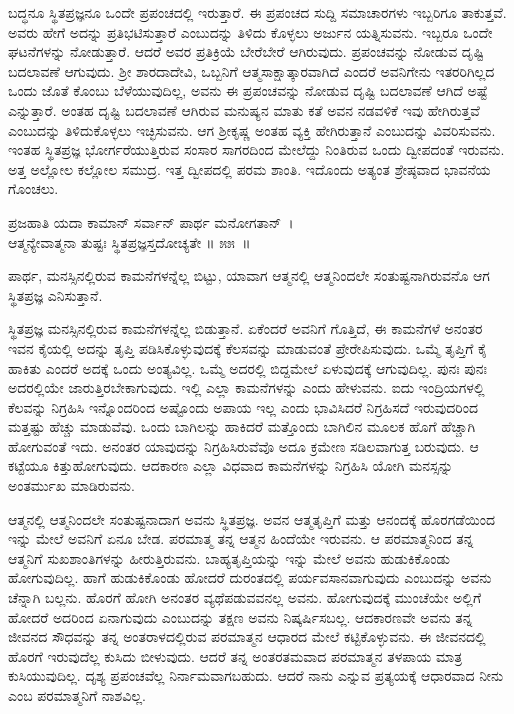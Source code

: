 ಬದ್ಧನೂ ಸ್ಥಿತಪ್ರಜ್ಞನೂ ಒಂದೇ ಪ್ರಪಂಚದಲ್ಲಿ ಇರುತ್ತಾರೆ. ಈ ಪ್ರಪಂಚದ ಸುದ್ದಿ ಸಮಾಚಾರಗಳು ಇಬ್ಬರಿಗೂ ತಾಕುತ್ತವೆ. ಅವರು ಹೇಗೆ ಅದನ್ನು ಪ್ರತಿಭಟಿಸುತ್ತಾರೆ ಎಂಬುದನ್ನು ತಿಳಿದು ಕೊಳ್ಳಲು ಅರ್ಜುನ ಯತ್ನಿಸುವನು. ಇಬ್ಬರೂ ಒಂದೇ ಘಟನೆಗಳನ್ನು ನೋಡುತ್ತಾರೆ. ಆದರೆ ಅವರ ಪ್ರತಿಕ್ರಿಯೆ ಬೇರೆಬೇರೆ ಆಗಿರುವುದು. ಪ್ರಪಂಚವನ್ನು ನೋಡುವ ದೃಷ್ಟಿ ಬದಲಾವಣೆ ಆಗುವುದು. ಶ‍್ರೀ ಶಾರದಾದೇವಿ, ಒಬ್ಬನಿಗೆ ಆತ್ಮಸಾಕ್ಷಾತ್ಕಾರವಾಗಿದೆ ಎಂದರೆ ಅವನಿಗೇನು ಇತರರಿಗಿಲ್ಲದ ಒಂದು ಜೊತೆ ಕೊಂಬು ಬೆಳೆಯುವುದಿಲ್ಲ, ಅವನು ಈ ಪ್ರಪಂಚವನ್ನು ನೋಡುವ ದೃಷ್ಟಿ ಬದಲಾವಣೆ ಆಗಿದೆ ಅಷ್ಟೆ ಎನ್ನುತ್ತಾರೆ. ಅಂತಹ ದೃಷ್ಟಿ ಬದಲಾವಣೆ ಆಗಿರುವ ಮನುಷ್ಯನ ಮಾತು ಕತೆ ಅವನ ನಡವಳಿಕೆ ಇವು ಹೇಗಿರುತ್ತವೆ ಎಂಬುದನ್ನು ತಿಳಿದುಕೊಳ್ಳಲು ಇಚ್ಛಿಸುವನು. ಆಗ ಶ‍್ರೀಕೃಷ್ಣ ಅಂತಹ ವ್ಯಕ್ತಿ ಹೇಗಿರುತ್ತಾನೆ ಎಂಬುದನ್ನು ವಿವರಿಸುವನು. ಇಂತಹ ಸ್ಥಿತಪ್ರಜ್ಞ ಭೋರ್ಗರೆಯುತ್ತಿರುವ ಸಂಸಾರ ಸಾಗರದಿಂದ ಮೇಲೆದ್ದು ನಿಂತಿರುವ ಒಂದು ದ್ವೀಪದಂತೆ ಇರುವನು. ಅತ್ತ ಅಲ್ಲೋಲ ಕಲ್ಲೋಲ ಸಮುದ್ರ. ಇತ್ತ ದ್ವೀಪದಲ್ಲಿ ಪರಮ ಶಾಂತಿ. ಇದೊಂದು ಅತ್ಯಂತ ಶ್ರೇಷ್ಠವಾದ ಭಾವನೆಯ ಗೊಂಚಲು.

\begin{shloka}
ಪ್ರಜಹಾತಿ ಯದಾ ಕಾಮಾನ್ ಸರ್ವಾನ್ ಪಾರ್ಥ ಮನೋಗತಾನ್~।\\ಆತ್ಮನ್ಯೇವಾತ್ಮನಾ ತುಷ್ಟಃ ಸ್ಥಿತಪ್ರಜ್ಞಸ್ತದೋಚ್ಯತೇ \hfill॥ ೫೫~॥
\end{shloka}

\begin{artha}
ಪಾರ್ಥ, ಮನಸ್ಸಿನಲ್ಲಿರುವ ಕಾಮನೆಗಳನ್ನೆಲ್ಲ ಬಿಟ್ಟು, ಯಾವಾಗ ಆತ್ಮನಲ್ಲಿ ಆತ್ಮನಿಂದಲೇ ಸಂತುಷ್ಟನಾಗಿರುವನೊ ಆಗ ಸ್ಥಿತಪ್ರಜ್ಞ ಎನಿಸುತ್ತಾನೆ.
\end{artha}

ಸ್ಥಿತಪ್ರಜ್ಞ ಮನಸ್ಸಿನಲ್ಲಿರುವ ಕಾಮನೆಗಳನ್ನೆಲ್ಲ ಬಿಡುತ್ತಾನೆ. ಏಕೆಂದರೆ ಅವನಿಗೆ ಗೊತ್ತಿದೆ, ಈ ಕಾಮನೆಗಳೆ ಅನಂತರ ಇವನ ಕೈಯಲ್ಲಿ ಅದನ್ನು ತೃಪ್ತಿ ಪಡಿಸಿಕೊಳ್ಳುವುದಕ್ಕೆ ಕೆಲಸವನ್ನು ಮಾಡುವಂತೆ ಪ್ರೇರೇಪಿಸುವುದು. ಒಮ್ಮೆ ತೃಪ್ತಿಗೆ ಕೈ ಹಾಕಿತು ಎಂದರೆ ಅದಕ್ಕೆ ಒಂದು ಅಂತ್ಯವಿಲ್ಲ. ಒಮ್ಮೆ ಅದರಲ್ಲಿ ಬಿದ್ದಮೇಲೆ ಏಳುವುದಕ್ಕೆ ಆಗುವುದಿಲ್ಲ. ಪುನಃ ಪುನಃ ಅದರಲ್ಲಿಯೇ ಜಾರುತ್ತಿರಬೇಕಾಗುವುದು. ಇಲ್ಲಿ ಎಲ್ಲಾ ಕಾಮನೆಗಳನ್ನು ಎಂದು ಹೇಳುವನು. ಐದು ಇಂದ್ರಿಯಗಳಲ್ಲಿ ಕೆಲವನ್ನು ನಿಗ್ರಹಿಸಿ ಇನ್ನೊಂದರಿಂದ ಅಷ್ಟೊಂದು ಅಪಾಯ ಇಲ್ಲ ಎಂದು ಭಾವಿಸಿದರೆ ನಿಗ್ರಹಿಸದೆ ಇರುವುದರಿಂದ ಮತ್ತಷ್ಟು ಹೆಚ್ಚು ಮಾಡುವೆವು. ಒಂದು ಬಾಗಿಲನ್ನು ಹಾಕಿದರೆ ಮತ್ತೊಂದು ಬಾಗಿಲಿನ ಮೂಲಕ ಹೊಗೆ ಹೆಚ್ಚಾಗಿ ಹೋಗುವಂತೆ ಇದು. ಅನಂತರ ಯಾವುದನ್ನು ನಿಗ್ರಹಿಸಿರುವೆವೊ ಅದೂ ಕ್ರಮೇಣ ಸಡಿಲವಾಗುತ್ತ ಬರುವುದು. ಆ ಕಟ್ಟೆಯೂ ಕಿತ್ತುಹೋಗುವುದು. ಆದಕಾರಣ ಎಲ್ಲಾ ವಿಧವಾದ ಕಾಮನೆಗಳನ್ನು ನಿಗ್ರಹಿಸಿ ಯೋಗಿ ಮನಸ್ಸನ್ನು ಅಂತರ್ಮುಖ ಮಾಡಿರುವನು.

ಆತ್ಮನಲ್ಲಿ ಆತ್ಮನಿಂದಲೇ ಸಂತುಷ್ಟನಾದಾಗ ಅವನು ಸ್ಥಿತಪ್ರಜ್ಞ. ಅವನ ಆತ್ಮತೃಪ್ತಿಗೆ ಮತ್ತು ಆನಂದಕ್ಕೆ ಹೊರಗಡೆಯಿಂದ ಇನ್ನು ಮೇಲೆ ಅವನಿಗೆ ಏನೂ ಬೇಡ. ಪರಮಾತ್ಮ ತನ್ನ ಆತ್ಮನ ಹಿಂದೆಯೇ ಇರುವನು. ಆ ಪರಮಾತ್ಮನಿಂದ ತನ್ನ ಆತ್ಮನಿಗೆ ಸುಖಶಾಂತಿಗಳನ್ನು ಹೀರುತ್ತಿರುವನು. ಬಾಹ್ಯತೃಪ್ತಿಯನ್ನು ಇನ್ನು ಮೇಲೆ ಅವನು ಹುಡುಕಿಕೊಂಡು ಹೋಗುವುದಿಲ್ಲ. ಹಾಗೆ ಹುಡುಕಿಕೊಂಡು ಹೋದರೆ ದುರಂತದಲ್ಲಿ ಪರ್ಯವಸಾನವಾಗುವುದು ಎಂಬುದನ್ನು ಅವನು ಚೆನ್ನಾಗಿ ಬಲ್ಲನು. ಹೊರಗೆ ಹೋಗಿ ಅನಂತರ ವ್ಯಥೆಪಡುವವನಲ್ಲ ಅವನು. ಹೋಗುವುದಕ್ಕೆ ಮುಂಚೆಯೇ ಅಲ್ಲಿಗೆ ಹೋದರೆ ಅದರಿಂದ ಏನಾಗುವುದು ಎಂಬುದನ್ನು ತಕ್ಷಣ ಅವನು ನಿಷ್ಕರ್ಷಿಸಬಲ್ಲ. ಆದಕಾರಣವೇ ಅವನು ತನ್ನ ಜೀವನದ ಸೌಧವನ್ನು ತನ್ನ ಅಂತರಾಳದಲ್ಲಿರುವ ಪರಮಾತ್ಮನ ಆಧಾರದ ಮೇಲೆ ಕಟ್ಟಿಕೊಳ್ಳುವನು. ಈ ಜೀವನದಲ್ಲಿ ಹೊರಗೆ ಇರುವುದೆಲ್ಲ ಕುಸಿದು ಬೀಳುವುದು. ಆದರೆ ತನ್ನ ಅಂತರತಮವಾದ ಪರಮಾತ್ಮನ ತಳಪಾಯ ಮಾತ್ರ ಕುಸಿಯುವುದಿಲ್ಲ. ದೃಶ್ಯ ಪ್ರಪಂಚವೆಲ್ಲ ನಿರ್ನಾಮವಾಗಬಹುದು. ಆದರೆ ನಾನು ಎನ್ನುವ ಪ್ರತ್ಯಯಕ್ಕೆ ಆಧಾರವಾದ ನೀನು ಎಂಬ ಪರಮಾತ್ಮನಿಗೆ ನಾಶವಿಲ್ಲ.

